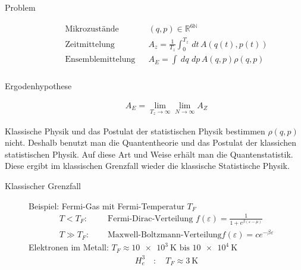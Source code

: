 \documentclass[11pt]{article}
\theoremstyle{plain}
\theoremstyle{mytheoremstyle}
\newcommand{\R}{\mathbb{R}}
\newcommand{\N}{\mathbb{N}}
\renewcommand{\d}[1]{\,d#1\,}
\begin{document}
\begin{description}
  \item[Problem]
    \begin{align*}
      \text{Mikrozust\"ande } && (q,p) \in \R^{6\N} \\
      \text{Zeitmittelung} && A_z = \frac{1}{T_z} \int_{0}^{T_z} \d{t} A(q(t),p(t)) \\
      \text{Ensemblemittelung} && A_E = \int_{}^{} \d{q}\d{p} A(q,p) \rho(q,p) \\
    \end{align*}
  \item[Ergodenhypothese] %
    \begin{align*}
      A_E = \lim_{T_z\to  \infty} \lim_{N\to  \infty} A_Z
    \end{align*}
\end{description}
Klassische Physik und das Postulat der statistischen Physik bestimmen 
$\rho(q,p)$ nicht. Deshalb benutzt man die Quantentheorie und das Postulat
der klassichen statistischen Physik. Auf diese Art und Weise erh\"alt man
die Quantenstatistik. Diese ergibt im klassischen Grenzfall wieder die
klassische Statistische Physik. 
\begin{description}
  \item[Klassischer Grenzfall] 
    Beispiel: Fermi-Gas mit Fermi-Temperatur $T_F$ \\
      \begin{align*}
        T < T_F:& \quad \text{ Fermi-Dirac-Verteilung } f(\varepsilon)
        = \frac{1}{1 + e^{\beta(\varepsilon - \mu)}} \\
        T \gg T_F: & \quad \text{ Maxwell-Boltzmann-Verteilung} f(\varepsilon)
        = c e^{-\beta \varepsilon}
      \end{align*}
      Elektronen im Metall: $T_F \approx \SI{10e3 }{\kelvin} \text{ bis } \SI{10e4}{\kelvin}$
      \begin{align*}
        H_e^3 \quad: \quad T_F \approx \SI{3}{\kelvin}
      \end{align*}
\end{description}
\end{document}
